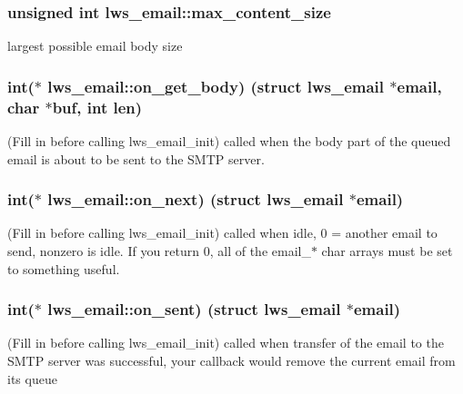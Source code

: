\subsubsection[{\texorpdfstring{max\+\_\+content\+\_\+size}{max\_content\_size}}]{\setlength{\rightskip}{0pt plus 5cm}unsigned int lws\+\_\+email\+::max\+\_\+content\+\_\+size}\hypertarget{structlws__email_a7bbc1964889c984b3da723c86a210e05}{}\label{structlws__email_a7bbc1964889c984b3da723c86a210e05}
largest possible email body size 
\subsubsection[{\texorpdfstring{on\+\_\+get\+\_\+body}{on\_get\_body}}]{\setlength{\rightskip}{0pt plus 5cm}int($\ast$ lws\+\_\+email\+::on\+\_\+get\+\_\+body) (struct {\bf lws\+\_\+email} $\ast$email, char $\ast$buf, int len)}\hypertarget{structlws__email_a2aff78c8e04db243052aa91b4d87e987}{}\label{structlws__email_a2aff78c8e04db243052aa91b4d87e987}
(Fill in before calling lws\+\_\+email\+\_\+init) called when the body part of the queued email is about to be sent to the S\+M\+TP server. 
\subsubsection[{\texorpdfstring{on\+\_\+next}{on\_next}}]{\setlength{\rightskip}{0pt plus 5cm}int($\ast$ lws\+\_\+email\+::on\+\_\+next) (struct {\bf lws\+\_\+email} $\ast$email)}\hypertarget{structlws__email_ad8dc60353ee246d84dd59ec0591e9719}{}\label{structlws__email_ad8dc60353ee246d84dd59ec0591e9719}
(Fill in before calling lws\+\_\+email\+\_\+init) called when idle, 0 = another email to send, nonzero is idle. If you return 0, all of the email\+\_\+$\ast$ char arrays must be set to something useful. 
\subsubsection[{\texorpdfstring{on\+\_\+sent}{on\_sent}}]{\setlength{\rightskip}{0pt plus 5cm}int($\ast$ lws\+\_\+email\+::on\+\_\+sent) (struct {\bf lws\+\_\+email} $\ast$email)}\hypertarget{structlws__email_a39ef6263d58eb40cca417c8697b227d8}{}\label{structlws__email_a39ef6263d58eb40cca417c8697b227d8}
(Fill in before calling lws\+\_\+email\+\_\+init) called when transfer of the email to the S\+M\+TP server was successful, your callback would remove the current email from its queue 
